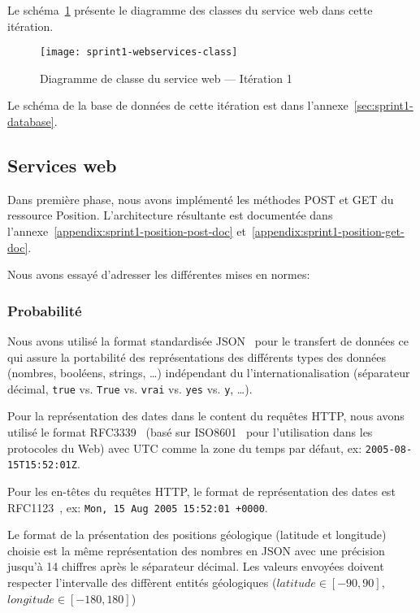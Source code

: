 Le schéma~\ref{fig:sprint1-webservices-class} présente le diagramme des classes
du service web dans cette itération.

\begin{figure}[H]
    \centering
    \texttt{[image: sprint1-webservices-class]}
    \caption{Diagramme de classe du service web --- Itération 1}
\label{fig:sprint1-webservices-class}
\end{figure}

Le schéma de la base de données de cette itération est dans
l'annexe~\ref{sec:sprint1-database}.

\subsection{Services web}

Dans première phase, nous avons implémenté les méthodes POST et GET du
ressource Position. L'architecture résultante est documentée dans
l'annexe~\ref{appendix:sprint1-position-post-doc}
et~\ref{appendix:sprint1-position-get-doc}.

Nous avons essayé d'adresser les différentes mises en normes:

\subsubsection{Probabilité}

Nous avons utilisé la format standardisée JSON~\cite{ECMA-404} pour le
transfert de données ce qui assure la portabilité des représentations des
différents types des données (nombres, booléens, strings, \ldots) indépendant
du l'internationalisation (séparateur décimal, \verb|true| vs. \verb|True| vs.
\verb|vrai| vs. \verb|yes| vs. \verb|y|, \ldots).

Pour la représentation des dates dans le content du requêtes HTTP, nous avons
utilisé le format RFC3339~\cite{RFC3339} (basé sur ISO8601~\cite{ISO8601} pour
l'utilisation dans les protocoles du Web) avec UTC comme la zone du temps par
défaut, ex: \verb|2005-08-15T15:52:01Z|.

Pour les en-têtes du requêtes HTTP, le format de représentation des dates est
RFC1123~\cite{RFC1123}, ex: \verb|Mon, 15 Aug 2005 15:52:01 +0000|.

Le format de la présentation des positions géologique (latitude et longitude)
choisie est la même représentation des nombres en JSON avec une précision
jusqu'à 14 chiffres après le séparateur décimal. Les valeurs envoyées doivent
respecter l'intervalle des diffèrent entités géologiques ($latitude \in [-90,
90]$, $longitude \in [-180, 180]$)

